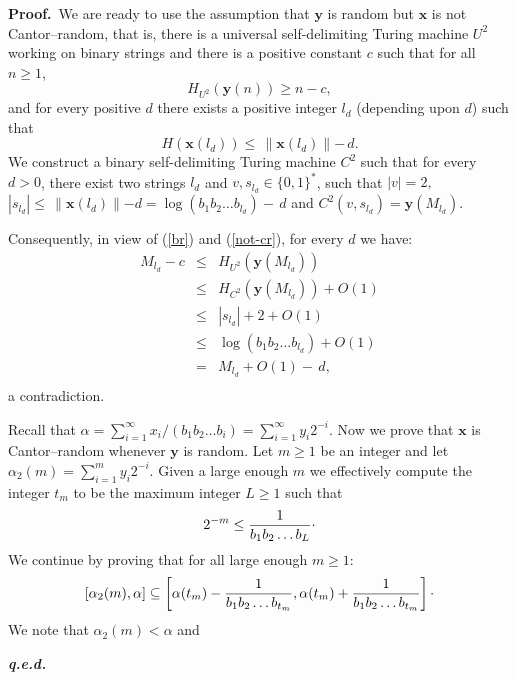 \documentclass[11pt,a4paper,twoside]{article}
\newcommand{\x}{{\mathbf x}}
\newcommand{\y}{{\mathbf y}}
\def \raisedot {\raisebox{.5ex}{.}}
\newenvironment{proof}{\textbf{Proof.\,}}{\hfill\textbf{\itshape
q.e.d.}\par}
\begin{document}
\begin{proof}
We are ready to use the assumption  that
$\y$ is  random but $\x$ is not Cantor--random, that is, there is
  a universal self-delimiting Turing machine $U^{2}$ working
on binary strings and there is
 a positive constant $c$ such that for all $n\ge 1$,
\begin{equation}
\label{br}
H_{U^{2}} (\y(n)) \ge n-c,
\end{equation}
and 
 for every positive $d$ there exists a positive integer $l_{d}$ (depending
upon $d$) such that
\begin{equation}
\label{not-cr}
H(\x(l_{d})) \le \, \parallel \x(l_{d})
\parallel - \, d.
\end{equation}
We construct a binary self-delimiting Turing machine $C^{2}$
such that for every $d>0$, there exist two strings $l_{d}$ and $v,
s_{l_{d}}\in \{0,1\}^{*}$, such that $|v| = 2,$  $|s_{l_{d}}| \le
\,\parallel  \x(l_{d}) \parallel -d = \log (b_{1} b_{2}\ldots b_{l_{d}}) -\, d$
and $C^{2}(v, s_{l_{d}}) = \y(M_{l_{d}})$.

Consequently, in view of (\ref{br}) and (\ref{not-cr}),  for every $d$ we
have:
\begin{eqnarray*}
M_{l_{d}} -c & \le &  H_{U^{2}}(\y(M_{l_{d}}))\\
& \le &  H_{C^{2}}(\y(M_{l_{d}})) + O(1)\\
& \le & |s_{l_{d}}| + 2 + O(1)\\
& \le & \log (b_{1} b_{2}\ldots b_{l_{d}}) + O(1)\\
& = &  M_{l_{d}} + O(1) -  \,d,\\
\end{eqnarray*}
a contradiction.

Recall that $\alpha = \sum_{i=1}^{\infty} x_{i}/(b_{1} b_{2}\ldots b_{i}) =
\sum_{i=1}^{\infty} y_{i}2^{-i}$. Now we prove that $\x$ is Cantor--random
whenever $\y$ is random. Let $m\ge 1$ be an integer and let $\alpha_{2}(m)
= \sum_{i=1}^{m} y_{i}2^{-i}$. Given  a large enough $m$ we effectively
compute the integer $t_{m}$ to be the maximum integer $L\ge 1$ such that
\begin{equation}
\label{tm}
2^{-m} \le \frac{1}{b_{1}b_{2}\ldots b_{L}}\raisedot
\end{equation}
We continue by proving that for all large enough  $m\ge 1$:
\begin{equation}
\label{cantorineq}
[\alpha_{2}(m), \alpha] \subseteq \left[\alpha (t_{m})
-
\frac{1}{b_{1}b_{2}\ldots b_{t_{m}}}, \alpha (t_{m}) +
\frac{1}{b_{1}b_{2}\ldots b_{t_{m}}}\right]\raisedot
\end{equation}
We note that $\alpha_{2}(m) < \alpha$ and




\end{proof}
\end{document}
